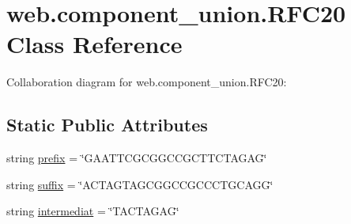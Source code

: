 \hypertarget{classweb_1_1component__union_1_1_r_f_c20}{\section{web.\-component\-\_\-union.\-R\-F\-C20 Class Reference}
\label{classweb_1_1component__union_1_1_r_f_c20}
}


Collaboration diagram for web.\-component\-\_\-union.\-R\-F\-C20\-:
\subsection*{Static Public Attributes}
\begin{DoxyCompactItemize}
\item 
string \hyperlink{classweb_1_1component__union_1_1_r_f_c20_ab205c2c6376fb4675b10f603414a0231}{prefix} = \char`\"{}G\-A\-A\-T\-T\-C\-G\-C\-G\-G\-C\-C\-G\-C\-T\-T\-C\-T\-A\-G\-A\-G\char`\"{}
\item 
string \hyperlink{classweb_1_1component__union_1_1_r_f_c20_a55fba88b8140182ab2640398452cd379}{suffix} = \char`\"{}A\-C\-T\-A\-G\-T\-A\-G\-C\-G\-G\-C\-C\-G\-C\-C\-C\-T\-G\-C\-A\-G\-G\char`\"{}
\item 
string \hyperlink{classweb_1_1component__union_1_1_r_f_c20_ae0900321fd9f180c245efe9f05628326}{intermediat} = \char`\"{}T\-A\-C\-T\-A\-G\-A\-G\char`\"{}
\end{DoxyCompactItemize}


